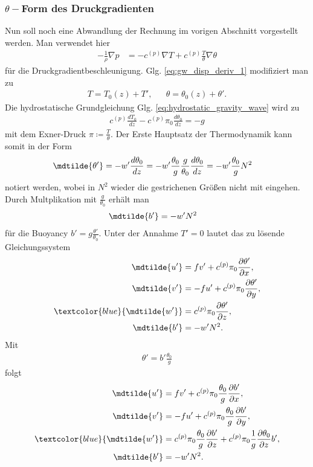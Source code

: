 \subsubsection{$\theta-$Form des Druckgradienten}
\label{sec:theta-form_des_druckgradienten}

Nun soll noch eine Abwandlung der Rechnung im vorigen Abschnitt vorgestellt werden. Man verwendet hier
%
\begin{align}
-\frac{1}{\rho}\nabla p &= -c^{(p)}\nabla T + c^{(p)}\frac{T}{\theta}\nabla\theta
\end{align}
%
für die Druckgradientbeschleunigung. Glg. \eqref{eq:gw_disp_deriv_1} modifiziert man zu
%
\begin{align}
T = T_0\left(z\right) + T', && \theta = \theta_0\left(z\right) + \theta'.
\end{align}
%
Die hydrostatische Grundgleichung Glg. \eqref{eq:hydrostatic_gravity_wave} wird zu
%
\begin{align}
c^{(p)}\frac{dT_0}{dz} - c^{(p)}\pi_0\frac{d\theta_0}{dz} = -g
\end{align}
%
mit dem Exner-Druck $\pi \coloneqq \frac{T}{\theta}$. Der Erste Hauptsatz der Thermodynamik kann somit in der Form
%
\begin{align}
\mdtilde{\theta'} &= -w'\frac{d\theta_0}{dz} = -w'\frac{\theta_0}{g}\frac{g}{\theta_0}\frac{d\theta_0}{dz} = -w'\frac{\theta_0}{g}N^2
\end{align}
%
notiert werden, wobei in $N^2$ wieder die gestrichenen Größen nicht mit eingehen. Durch Multplikation mit $\frac{g}{\theta_0}$ erhält man
%
\begin{align}
\mdtilde{b'} &= -w'N^2
\end{align}
%
für die Buoyancy $b' = g\frac{\theta'}{\theta_0}$. Unter der Annahme $T' = 0$ lautet das zu lösende Gleichungssystem
%
\begin{align}
\mdtilde{u'} & = fv' + c^{(p)}\pi_0\frac{\partial\theta'}{\partial x},\\
\mdtilde{v'} & = -fu' + c^{(p)}\pi_0\frac{\partial\theta'}{\partial y},\\
\textcolor{blue}{\mdtilde{w'}} & = c^{(p)}\pi_0\frac{\partial\theta'}{\partial z},\\
\mdtilde{b'} & = -w'N^2.
\end{align}
%
Mit
%
\begin{align}
\theta' = b'\frac{\theta_0}{g}
\end{align}
%
folgt
%
\begin{align}
\mdtilde{u'} & = fv' + c^{(p)}\pi_0\frac{\theta_0}{g}\frac{\partial b'}{\partial x},\\
\mdtilde{v'} & = -fu' + c^{(p)}\pi_0\frac{\theta_0}{g}\frac{\partial b'}{\partial y},\\
\textcolor{blue}{\mdtilde{w'}} & = c^{(p)}\pi_0\frac{\theta_0}{g}\frac{\partial b'}{\partial z} + c^{(p)}\pi_0\frac{1}{g}\frac{\partial\theta_0}{\partial z}b',\\
\mdtilde{b'} & = -w'N^2.
\end{align}
